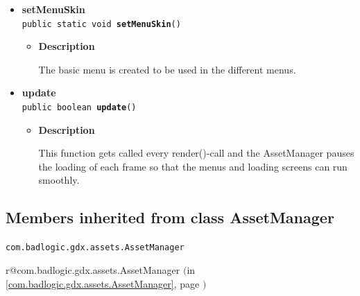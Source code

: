 \documentclass[11pt,a4paper]{report}
\makeatletter
\newcommand{\refdefined}[1]{
\expandafter\ifx\csname r@#1\endcsname\relax
\relax\else
{$($in \ref{#1}, page \pageref{#1}$)$}\fi}
\makeatother
\begin{document}
{{{\begin{itemize}
{\begin{itemize}
{QueueLoading loads the assets in the format: manager.load("file location in assets", fileType.class); libGDX AssetManager currently supports: Pixmap, Texture, BitmapFont, TextureAtlas, TiledAtlas, TiledMapRenderer, Music and Sound.
}
\end{itemize}
}%
\item{ 
{\bf  setMenuSkin}\\
\texttt{public static void\ {\bf  setMenuSkin}()
\label{com.retroMachines.data.AssetManager.setMenuSkin()}}%
\begin{itemize}
\item{
{\bf  Description}

The basic menu is created to be used in the different menus.
}
\end{itemize}
}%
\item{ 
{\bf  update}\\
\texttt{public boolean\ {\bf  update}()
\label{com.retroMachines.data.AssetManager.update()}}%
\begin{itemize}
\item{
{\bf  Description}

This function gets called every render()-call and the AssetManager pauses the loading of each frame so that the menus and loading screens can run smoothly.
}
\end{itemize}
}%
\end{itemize}
}
\subsection{Members inherited from class AssetManager }{
\texttt{com.badlogic.gdx.assets.AssetManager} {\small 
\refdefined{com.badlogic.gdx.assets.AssetManager}}
{\small 

}}}}
\end{document}
